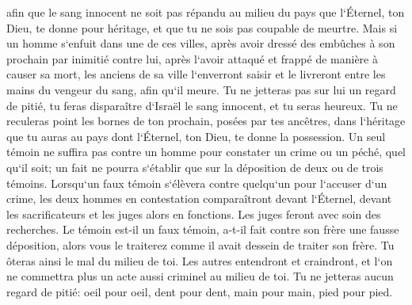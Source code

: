\verse afin que le sang innocent ne soit pas répandu au milieu du pays que l`Éternel, ton Dieu, te donne pour héritage, et que tu ne sois pas coupable de meurtre. 
\verse Mais si un homme s`enfuit dans une de ces villes, après avoir dressé des embûches à son prochain par inimitié contre lui, après l`avoir attaqué et frappé de manière à causer sa mort, 
\verse les anciens de sa ville l`enverront saisir et le livreront entre les mains du vengeur du sang, afin qu`il meure. 
\verse Tu ne jetteras pas sur lui un regard de pitié, tu feras disparaître d`Israël le sang innocent, et tu seras heureux. 
\verse Tu ne reculeras point les bornes de ton prochain, posées par tes ancêtres, dans l`héritage que tu auras au pays dont l`Éternel, ton Dieu, te donne la possession. 
\verse Un seul témoin ne suffira pas contre un homme pour constater un crime ou un péché, quel qu`il soit; un fait ne pourra s`établir que sur la déposition de deux ou de trois témoins. 
\verse Lorsqu`un faux témoin s`élèvera contre quelqu`un pour l`accuser d`un crime, 
\verse les deux hommes en contestation comparaîtront devant l`Éternel, devant les sacrificateurs et les juges alors en fonctions. 
\verse Les juges feront avec soin des recherches. Le témoin est-il un faux témoin, a-t-il fait contre son frère une fausse déposition, 
\verse alors vous le traiterez comme il avait dessein de traiter son frère. Tu ôteras ainsi le mal du milieu de toi. 
\verse Les autres entendront et craindront, et l`on ne commettra plus un acte aussi criminel au milieu de toi. 
\verse Tu ne jetteras aucun regard de pitié: oeil pour oeil, dent pour dent, main pour main, pied pour pied. 

